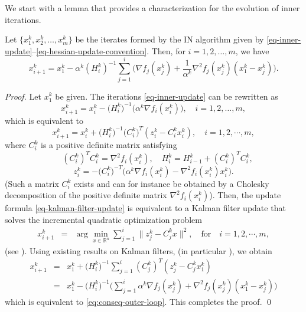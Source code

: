 \documentclass[final,numbook]{svjour3}
\begin{document}
We start with a lemma that provides a characterization for the evolution of inner iterations.  
\begin{lemma}\label{lemm:conseq-iters}Let $\{x_1^k, x_2^k,\dots, x_m^k\}$ be the iterates formed by the IN algorithm given by \eqref{eq-inner-update}--\eqref{eq-hessian-update-convention}. Then, for $i=1,2,\dots,m$, we have 
\begin{equation} \label{eq:conseq-outer-loop}
  x_{i+1}^k = x_1^k - \alpha^k (H_i^k)^{-1} \sum_{j=1}^i \bigg(\nabla f_j (x_j^k) + \frac{1}{\alpha^k} \nabla^2 f_j(x_j^k)(x_1^k - x_j^k) \bigg).
\end{equation} 
\end{lemma}
\begin{proof}
Let $x_1^k$ be given. The iterations \eqref{eq-inner-update} can be rewritten as
$$x_{i+1}^k = x_i^k - \big(H_i^k\big)^{-1} \big( \alpha^k  \nabla  f_i (x_i^k)\big), \quad i=1,2,\dots,m, $$
which is equivalent to
\begin{equation}\label{eq-kalman-filter-update} x_{i+1}^k =  x_i^k + \big(H_i^k\big)^{-1} \big(C_i^k\big)^T ( z_i^k - C_i^k x_i^k), \quad i=1,2,\cdots,m,
\end{equation}
where $C_i^k$ is a positive definite matrix satisfying
$$ \quad (C_i^k)^T C_i^k = \nabla^2 f_i(x_i^k), \quad H_{i}^k = H_{i-1}^k + (C_i^k)^T C_i^k, $$  
$$z_i^k = - \big(C_i^k\big)^{-T} \big( \alpha^k \nabla f_i(x_i^k) -  \nabla^2 f_i(x_i^k) x_i^k \big).$$
(Such a matrix $C_i^k$ exists and can for instance be obtained by a Cholesky decomposition of the positive definite matrix $\nabla^2 f_i(x_i^k)$). Then, the update formula \eqref{eq-kalman-filter-update} is equivalent to a Kalman filter update that solves the incremental quadratic optimization problem 
     \begin{eqnarray*} x_{i+1}^k &=& \arg \min_{x \in {\mathbb R}^n} \sum_{j=1}^i \| z_j^k - C_j^k x \|^2, \quad \mbox{for} \quad i=1,2,\cdots,m,  
                   
     \end{eqnarray*} 
(see \cite[Proposition 1.5.2]{Bertsekas99nonlinear}). Using existing results on Kalman filters, (in particular \cite[Proposition 1.5.2]{Bertsekas99nonlinear}), we obtain
  \begin{eqnarray*} x_{i+1}^k &=& x_1^k + \big(H_i^k\big)^{-1} \sum_{j=1}^i (C_j^k)^T (z_j^k - C_j^k x_1^k) \\
      &=& x_1^k - \big(H_i^k\big)^{-1} \bigg( \sum_{j=1}^i  \alpha^k \nabla f_j(x_j^k) + \nabla^2 f_j(x_j^k) (x_1^k - x_j^k) \bigg)
  \end{eqnarray*}
which is equivalent to \eqref{eq:conseq-outer-loop}. This completes the proof. \qed
\end{proof}
\end{document}
